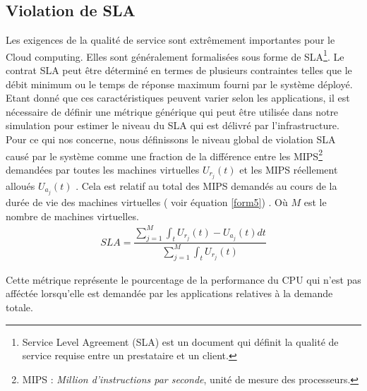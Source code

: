 \subsection{Violation de SLA}
\begin{onehalfspace}
Les exigences de la qualité de service sont extrêmement importantes pour le Cloud computing. Elles sont généralement formalisées sous forme de SLA\footnote{Service Level Agreement (SLA) est un document qui définit la qualité de service requise entre un prestataire et un client.}. Le contrat SLA peut être déterminé en termes de plusieurs contraintes  telles que le débit minimum ou le  temps de réponse maximum fourni par le système déployé. Etant donné que ces caractéristiques peuvent varier selon les applications, il est nécessaire de définir une métrique générique qui peut être utilisée dans notre simulation pour estimer le niveau du SLA qui est délivré par l’infrastructure. Pour ce qui nos concerne, nous définissons le niveau global de violation SLA causé par le système  comme une fraction de la différence entre les MIPS\footnote{MIPS : \textit{Million d'instructions par seconde}, unité de mesure des processeurs.} demandées par toutes les machines virtuelles $U_{r_{j}} (t)$ et les MIPS réellement alloués $U_{a_{j}} (t)$ . Cela est relatif au total des MIPS demandés au cours de la durée de vie des machines virtuelles ( voir équation \ref{form5}) \cite{ref43} . Où $M$ est le nombre de machines virtuelles.\medskip
\begin{align}
SLA = \dfrac{\sum_{j=1}^{M} \int_{t} U_{r_{j}} (t) - U_{a_{j}} (t) dt}{\sum_{j=1}^{M} \int_{t} U_{r_{j}} (t)}
\label{form5}
\end{align}\medskip

Cette métrique représente le pourcentage de la performance du CPU qui n'est pas afféctée lorsqu'elle est demandée par les applications relatives à la demande totale.
\end{onehalfspace}

